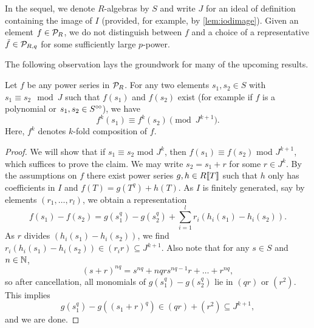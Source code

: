 \documentclass[../main.tex]{subfiles}
\begin{document}
In the sequel, we denote $R$-algebras by $S$ and write $J$ for an ideal
of definition containing the image of $I$ (provided, for example, by \ref{lem:iodimage}).
Given an element $f\in \mathcal{P}_R$, we do not distinguish between $f$ and a choice of a 
representative $\tilde f \in \mathcal{P}_{R,q}$ for some sufficiently large $p$-power.

The following observation lays the groundwork for many of the upcoming results.
\begin{lem}\label{lem:cryscalc}
  Let $f$ be any power series in $\mathcal{P}_R$. For any two elements $s_1,s_2 \in S$ 
  with $s_1 \equiv s_2 \mod J$ such that $f(s_1)$ and $f(s_2)$ exist (for
  example if $f$ is a polynomial or $s_1, s_2 \in S^{\circ \hspace{-0.5pt} \circ}$), we have 
  \begin{equation*}
    f^k(s_1) \equiv f^k(s_2) \pmod {J^{k+1}}.
  \end{equation*}
  Here, $f^k$ denotes $k$-fold composition of $f$.
\begin{proof}
  We will show that if $s_1 \equiv s_2$ mod $J^k$, then $f(s_1) \equiv f(s_2)$ mod 
  $J^{k+1}$, which suffices to prove the claim. 
  We may write $s_2 = s_1 + r$ for some $r\in J^k$. By the assumptions on $f$
  there exist power series 
  $g,h \in R\llbracket T \rrbracket$ such that $h$ only
  has coefficients in $I$ and $f(T) = g(T^q) + h(T)$. As $I$ is finitely generated,
  say by elements $(r_1, \dots, r_l)$, we obtain a representation 
  \begin{equation*}
    f(s_1) - f(s_2) = g(s_1^{q})-g(s_2^{q}) + \sum_{i=1}^l r_i \left(h_i(s_1) -
    h_i(s_2)\right).
  \end{equation*}
  As $r$ divides $\left(h_i(s_1) - h_i(s_2)\right)$, we find
  $r_i(h_i(s_1) - h_i(s_2)) \in (r_i r) \subseteq J^{k+1}$. Also note that 
  for any $s\in S$ and $n \in \mathbb{N}$, 
  $$(s+r)^{nq} = s^{nq} + nqrs^{nq-1}r + \dots + r^{nq},$$
  so after cancellation, all monomials of $g(s_1^q) - g(s_2^q)$ lie in
  $(qr)$ or $(r^2)$. This implies
  \begin{equation*}
    g(s_1^q) - g\left((s_1+r)^q\right) \in (qr) + (r^2) \subseteq J^{k+1},
  \end{equation*}
  and we are done.
\end{proof}
\end{lem}
\end{document}
